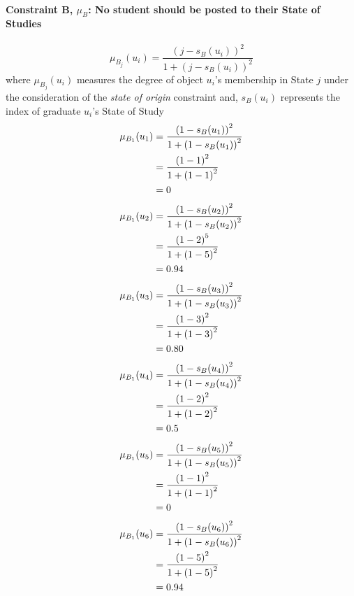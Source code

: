 \documentclass[a4paper,openany]{book}
\begin{document}
			\paragraph{Constraint B, $\mu_B$: No student should be posted to their State of Studies}
				\begin{equation}
					\mu_{B_j}(u_i) = \frac{\left(j-s_B(u_i)\right)^2}{1 + \left(j-s_B(u_i)\right)^2}
				\end{equation}
				where $\mu_{B_j}(u_i)$ measures the degree of object $u_i$'s membership in State $j$ under the consideration of the \textit{state of origin} constraint and,
				$s_B(u_i)$ represents the index of graduate $u_i$'s State of Study\\
				\begin{align}
					\mu_{B_1}(u_1) &= \frac{\left(1-s_B(u_1)\right)^2}{1 + \left(1-s_B(u_1)\right)^2}\\
					&= \frac{\left(1-1\right)^2}{1 + \left(1-1\right)^2} \notag \\
					&= 0 \notag
				\end{align}
				\begin{align}
					\mu_{B_1}(u_2) &= \frac{\left(1-s_B(u_2)\right)^2}{1 + \left(1-s_B(u_2)\right)^2}\\
					&= \frac{\left(1-2\right)^5}{1 + \left(1-5\right)^2} \notag \\
					&= 0.94 \notag
				\end{align}
				\begin{align}
					\mu_{B_1}(u_3) &= \frac{\left(1-s_B(u_3)\right)^2}{1 + \left(1-s_B(u_3)\right)^2}\\
					&= \frac{\left(1-3\right)^2}{1 + \left(1-3\right)^2} \notag \\
					&= 0.80 \notag
				\end{align}
				\begin{align}
					\mu_{B_1}(u_4) &= \frac{\left(1-s_B(u_4)\right)^2}{1 + \left(1-s_B(u_4)\right)^2}\\
					&= \frac{\left(1-2\right)^2}{1 + \left(1-2\right)^2} \notag \\
					&= 0.5 \notag
				\end{align}
				\begin{align}
					\mu_{B_1}(u_5) &= \frac{\left(1-s_B(u_5)\right)^2}{1 + \left(1-s_B(u_5)\right)^2}\\
					&= \frac{\left(1-1\right)^2}{1 + \left(1-1\right)^2} \notag \\
					&= 0 \notag
				\end{align}
				\begin{align}
					\mu_{B_1}(u_6) &= \frac{\left(1-s_B(u_6)\right)^2}{1 + \left(1-s_B(u_6)\right)^2}\\
					&= \frac{\left(1-5\right)^2}{1 + \left(1-5\right)^2} \notag \\
					&= 0.94 \notag
				\end{align}
\end{document}
